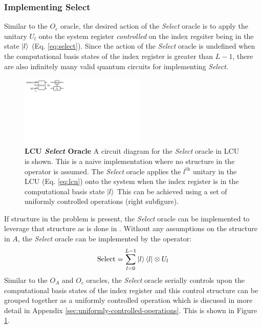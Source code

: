 \subsubsection{Implementing \textbf{Select}}

Similar to the $O_c$ oracle, the desired action of the \textit{Select} oracle is to apply the unitary $U_l$ onto the system register \textit{controlled} on the index regsiter being in the state $\ket{l}$ (Eq. \ref{eq:select}).
Since the action of the \textit{Select} oracle is undefined when the computational basis states of the index register is greater than $L - 1$, there are also infinitely many valid quantum circuits for implementing \textit{Select}.

\begin{figure}[h]
    \includegraphics[width=6cm]{figures/select-lcu.pdf}
    \caption{
        \textbf{LCU \textit{Select} Oracle}
        A circuit diagram for the \textit{Select} oracle in LCU is shown.
        This is a naive implementation where no structure in the operator is assumed.
        The \textit{Select} oracle applies the $l^\text{th}$ unitary in the LCU (Eq. \ref{eq:lcu}) onto the system when the index register is in the computational basis state $\ket{l}$
        This can be achieved using a set of uniformly controlled operations (right subfigure).
    }
    \label{fig:unstructured-select}
\end{figure}

If structure in the problem is present, the \textit{Select} oracle can be implemented to leverage that structure as is done in \cite{babbush2018encoding}.
Without any assumptions on the structure in $A$, the \textit{Select} oracle can be implemented by the operator:
\begin{equation}
    \label{eq:select-naive}
    \text{Select} = \sum_{l=0}^{L-1} \ket{l}\bra{l} \otimes U_l
\end{equation}
Similar to the $O_A$ and $O_c$ oracles, the \textit{Select} oracle serially controls upon the computational basis states of the index register and this control structure can be grouped together as a uniformly controlled operation which is discussd in more detail in Appendix \ref{sec:uniformly-controlled-operations}.
This is shown in Figure \ref{fig:unstructured-select}.

